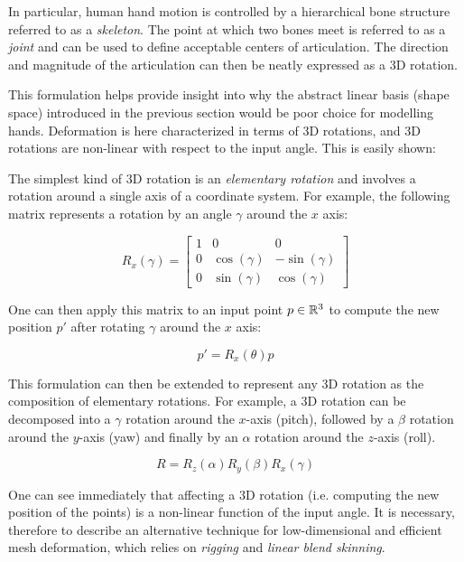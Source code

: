 In particular, human hand motion is controlled by a hierarchical bone structure referred to as a \emph{skeleton}. The point at which two bones meet is referred to as a \emph{joint} and can be used to define acceptable centers of articulation. The direction and magnitude of the articulation can then be neatly expressed as a 3D rotation.

This formulation helps provide insight into why the abstract linear basis (shape space) introduced in the previous section would be poor choice for modelling hands. Deformation is here characterized in terms of 3D rotations, and 3D rotations are non-linear with respect to the input angle. This is easily shown: 

\begin{definition}[3D Rotations]
    

The simplest kind of 3D rotation is an \emph{elementary rotation} and involves a rotation around a single axis of a coordinate system. For example, the following matrix represents a rotation by an angle $\gamma$ around the $x$ axis:

\begin{equation}
    R_{x}(\gamma) = \begin{bmatrix}
        1 & 0 & 0 \\
        0 & \cos(\gamma) & -\sin(\gamma) \\
        0 & \sin(\gamma) & \cos(\gamma)
    \end{bmatrix}
\end{equation}

One can then apply this matrix to an input point $p \in {\mathbb{R}^{3}}$ to compute the new position $p'$ after rotating $\gamma$ around the $x$ axis:

\begin{equation}
    p' = R_{x}(\theta)p
\end{equation}

This formulation can then be extended to represent any 3D rotation as the composition of elementary rotations. For example, a 3D rotation can be decomposed into a $\gamma$ rotation around the $x$-axis (pitch), followed by a $\beta$ rotation around the $y$-axis (yaw) and finally by an $\alpha$ rotation around the $z$-axis (roll). 

\begin{equation}  
    R = R_{z}(\alpha) R_{y}(\beta) R_{x}(\gamma)
\end{equation}

One can see immediately that affecting a 3D rotation (i.e. computing the new position of the points) is a non-linear function of the input angle. It is necessary, therefore to describe an alternative technique for low-dimensional and efficient mesh deformation, which relies on \emph{rigging} and \emph{linear blend skinning}. 

\end{definition}

